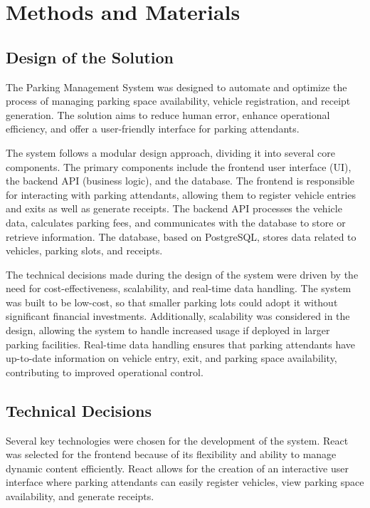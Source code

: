 \section{Methods and Materials}

\subsection{Design of the Solution}

The Parking Management System was designed to automate and optimize the process of managing parking space availability, vehicle registration, and receipt generation. The solution aims to reduce human error, enhance operational efficiency, and offer a user-friendly interface for parking attendants.

The system follows a modular design approach, dividing it into several core components. The primary components include the frontend user interface (UI), the backend API (business logic), and the database. The frontend is responsible for interacting with parking attendants, allowing them to register vehicle entries and exits as well as generate receipts. The backend API processes the vehicle data, calculates parking fees, and communicates with the database to store or retrieve information. The database, based on PostgreSQL, stores data related to vehicles, parking slots, and receipts.

The technical decisions made during the design of the system were driven by the need for cost-effectiveness, scalability, and real-time data handling. The system was built to be low-cost, so that smaller parking lots could adopt it without significant financial investments. Additionally, scalability was considered in the design, allowing the system to handle increased usage if deployed in larger parking facilities. Real-time data handling ensures that parking attendants have up-to-date information on vehicle entry, exit, and parking space availability, contributing to improved operational control.\cite{webbylab2024smartparking}

\subsection{Technical Decisions}

Several key technologies were chosen for the development of the system. React was selected for the frontend because of its flexibility and ability to manage dynamic content efficiently. React allows for the creation of an interactive user interface where parking attendants can easily register vehicles, view parking space availability, and generate receipts.

